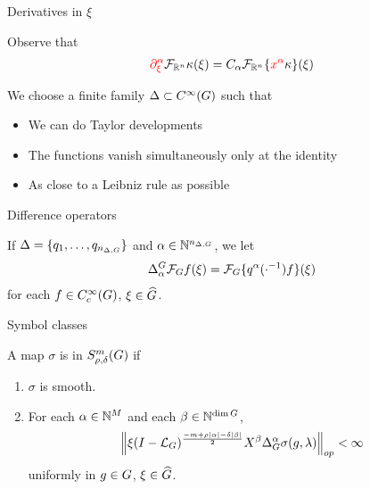 \documentclass{beamer}
\begin{document}
\begin{frame}
    {Derivatives in $\xi$}

    Observe that
    \begin{align*}
        {\color{red} \iD {\xi^\alpha}} \Fourier [\R^n] \kappa(\xi)
        = C_\alpha \Fourier [\R^n] {\{{\color{red} x^\alpha} \kappa\}}(\xi)
    \end{align*}

    \pause
    We choose a finite family $\Delta \subset {C^\infty(G)}$ such that
    \begin{itemize}
        \pause
        \item
            We can do Taylor developments
            \pause
        \item The functions vanish simultaneously only at the identity
            \pause
        \item
            As close to a Leibniz rule as possible
    \end{itemize}
\end{frame}

\begin{frame}
    {Difference operators}

    \begin{definition}

        If $\Delta = \{q_1, \dots, q_{n_{\Delta, G}} \}$ and $\alpha \in \mathbb{N}^{n_{\Delta, G}}$,
        we let
        \begin{align*}
            {\Delta^{G}_{\alpha}} \mathcal{F}_{G} f(\xi)
            = \mathcal{F}_{G} \{q^\alpha(\cdot^{-1}) f\}(\xi)
        \end{align*}
        for each $f \in C^\infty_c(G)$,
        $\xi \in {\widehat{G}}$.
    \end{definition}
\end{frame}

\begin{frame}{Symbol classes}
    \begin{definition}
        A map $\sigma$ is in $S^{m}_{\rho, \delta}(G)$ if
        \begin{enumerate}
            \item
                $\sigma$ is smooth.
            \item
                For each $\alpha \in \mathbb{N}^M$ and each $\beta \in \mathbb{N}^{\dim G}$,
                \begin{align*}
                    \norm [op] {
                        \xi \BesselPotential {-m + \rho \abs \alpha - \delta \abs \beta}
                        \LeftDifferentialOperator \beta \DifferenceOperatorOrder \alpha \sigma(g, \lambda)
                    } < \infty
                \end{align*}
                uniformly in $g \in G$, $\xi \in {\widehat{G}}$.
        \end{enumerate}
    \end{definition}
\end{frame}
\end{document}
